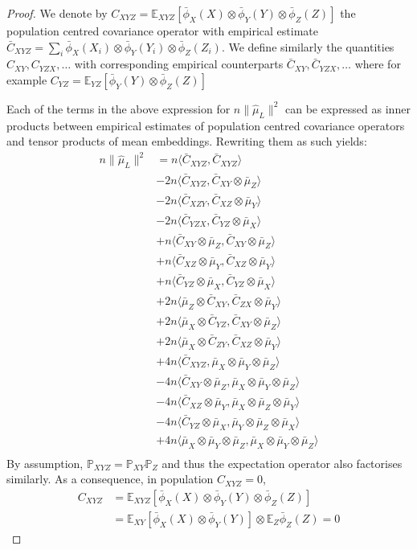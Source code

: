 \documentclass[]{article}
\begin{document}
\begin{proof}
We denote by $C_{XYZ} = \mathbb{E}_{XYZ}[\bar\phi_X(X)\otimes\bar\phi_Y(Y)\otimes\bar\phi_Z(Z)]$ the population centred covariance operator with empirical estimate $\bar{C}_{XYZ} = \sum_i\bar\phi_X(X_i)\otimes\bar\phi_Y(Y_i)\otimes\bar\phi_Z(Z_i)$. We define similarly the quantities $C_{XY}, C_{YZX}, \ldots$ with corresponding empirical counterparts $\bar{C}_{XY}, \bar{C}_{YZX}, \ldots$ where for example $C_{YZ} = \mathbb{E}_{YZ}[\bar\phi_Y(Y)\otimes\bar\phi_Z(Z)]$

Each of the terms in the above expression for $n\|\hat \mu_L\|^2$ can be expressed as inner products between empirical estimates of population centred covariance operators and tensor products of mean embeddings. Rewriting them as such yields:
\begin{align*}
n\|\hat \mu_L\|^2 &= n\langle \bar{C}_{XYZ},\bar{C}_{XYZ} \rangle \\& -
2n\langle \bar{C}_{XYZ},\bar{C}_{XY}\otimes\bar{\mu}_Z \rangle \\& -
2n\langle \bar{C}_{XZY},\bar{C}_{XZ}\otimes\bar{\mu}_Y \rangle \\& -
2n\langle \bar{C}_{YZX},\bar{C}_{YZ}\otimes\bar{\mu}_X \rangle \\& +
n\langle \bar{C}_{XY}\otimes\bar{\mu}_Z,\bar{C}_{XY}\otimes\bar{\mu}_Z \rangle \\& +
n\langle \bar{C}_{XZ}\otimes\bar{\mu}_Y,\bar{C}_{XZ}\otimes\bar{\mu}_Y \rangle \\& +
n\langle \bar{C}_{YZ}\otimes\bar{\mu}_X,\bar{C}_{YZ}\otimes\bar{\mu}_X \rangle \\& +
2n\langle \bar{\mu}_Z\otimes\bar{C}_{XY},\bar{C}_{ZX}\otimes\bar{\mu}_Y \rangle \\& +
2n\langle \bar{\mu}_X\otimes\bar{C}_{YZ},\bar{C}_{XY}\otimes\bar{\mu}_Z \rangle \\& +
2n\langle \bar{\mu}_X\otimes\bar{C}_{ZY},\bar{C}_{XZ}\otimes\bar{\mu}_Y \rangle \\& +
4n\langle \bar{C}_{XYZ},\bar{\mu}_X \otimes\bar{\mu}_Y \otimes \bar{\mu}_Z \rangle \\& -
4n\langle \bar{C}_{XY}\otimes \bar{\mu}_Z,\bar{\mu}_X \otimes\bar{\mu}_Y \otimes \bar{\mu}_Z \rangle \\& -
4n\langle \bar{C}_{XZ}\otimes \bar{\mu}_Y,\bar{\mu}_X \otimes\bar{\mu}_Z \otimes \bar{\mu}_Y \rangle \\& -
4n\langle \bar{C}_{YZ}\otimes \bar{\mu}_X,\bar{\mu}_Y \otimes\bar{\mu}_Z \otimes \bar{\mu}_X \rangle \\& +
4n\langle \bar{\mu}_X \otimes\bar{\mu}_Y \otimes \bar{\mu}_Z,\bar{\mu}_X \otimes\bar{\mu}_Y \otimes \bar{\mu}_Z \rangle \\
\end{align*}
By assumption, $\mathbb{P}_{XYZ} =\mathbb{P}_{XY}\mathbb{P}_{Z}$ and thus the expectation operator also factorises similarly. As a consequence, in population $C_{XYZ}=0$,  
\begin{align*}
C_{XYZ} &= \mathbb{E}_{XYZ}[\bar\phi_X(X)\otimes\bar\phi_Y(Y)\otimes\bar\phi_Z(Z)] \\
& = \mathbb{E}_{XY}[\bar\phi_X(X)\otimes\bar\phi_Y(Y)]\otimes\mathbb{E}_{Z}\bar\phi_Z(Z)=0
\end{align*}


\end{proof}
\end{document}

